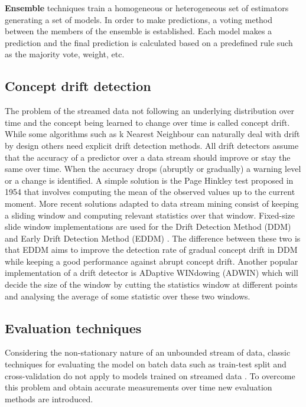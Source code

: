 \documentclass{sig-alternate-br}
\begin{document}
\textbf{Ensemble} techniques train a homogeneous \cite{bifet2012ensembles} or heterogeneous \cite{van2018online} set of estimators generating a set of models. In order to make predictions, a voting method between the members of the ensemble is established. Each model makes a prediction and the final prediction is calculated based on a predefined rule such as the majority vote, weight, etc.

\subsection{Concept drift detection}

The problem of the streamed data not following an underlying distribution over time and the concept being learned to change over time is called concept drift. While some algorithms such as k Nearest Neighbour can naturally deal with drift by design \cite{van2016massively} others need explicit drift detection methods. All drift detectors assume that the accuracy of a predictor over a data stream should improve or stay the same over time. When the accuracy drops (abruptly or gradually) a warning level or a change is identified. A simple solution is the Page Hinkley test proposed in 1954 \cite{page1954continuous} that involves computing the mean of the observed values up to the current moment. More recent solutions adapted to data stream mining consist of keeping a sliding window and computing relevant statistics over that window. Fixed-size slide window implementations are used for the Drift Detection Method (DDM) \cite{gama2004learning} and Early Drift Detection Method (EDDM) \cite{baena2006early}. The difference between these two is that EDDM aims to improve the detection rate of gradual concept drift in DDM while keeping a good performance against abrupt concept drift. Another popular implementation of a drift detector is ADaptive WINdowing (ADWIN) \cite{bifet2007learning} which will decide the size of the window by cutting the statistics window at different points and analysing the average of some statistic over these two windows.

\vspace{1cm}

\subsection{Evaluation techniques}
\label{evaluation}

Considering the non-stationary nature of an unbounded stream of data, classic techniques for evaluating the model on batch data such as train-test split and cross-validation do not apply to models trained on streamed data \cite{gama2009issues}. To overcome this problem and obtain accurate measurements over time new evaluation methods are introduced.
\end{document}
